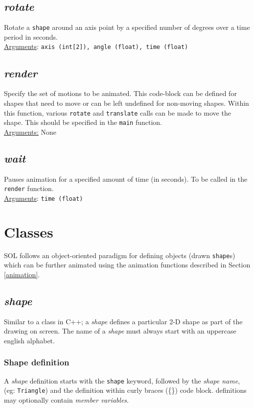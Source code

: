     \subsection{\textit{rotate}}
    Rotate a \texttt{shape} around an axis point by a specified number of degrees over a time period in seconds.\\
    \underline{Arguments}: \texttt{axis (int[2]), angle (float), time (float)}

    \subsection{\textit{render}}
    Specify the set of motions to be animated. This code-block can be defined for shapes that need to move or can be left undefined for non-moving shapes. Within this function, various \texttt{rotate} and \texttt{translate} calls can be made to move the shape. This should be specified in the \texttt{main} function.\\
    \underline{Arguments:} None

    \subsection{\textit{wait}}
    Pauses animation for a specified amount of time (in seconds). To be called in the \texttt{render} function.\\
    \underline{Arguments}: \texttt{time (float)}


\section{Classes} \label{classes}
SOL follows an object-oriented paradigm for defining objects (drawn \texttt{shape}s) which can be further animated using the animation functions described in Section \ref{animation}.

    \subsection{\textit{shape}}
    Similar to a class in C++; a \textit{shape} defines a particular 2-D shape as part of the drawing on screen. The name of a \textit{shape} must always start with an uppercase english alphabet.

    \subsubsection{Shape definition}
    A \textit{shape} definition starts with the \texttt{shape} keyword, followed by the \textit{shape name},(eg: \texttt{Triangle}) and the definition within curly braces (\{\}) code block.  definitions may optionally contain \textit{member variables}.\\
    
